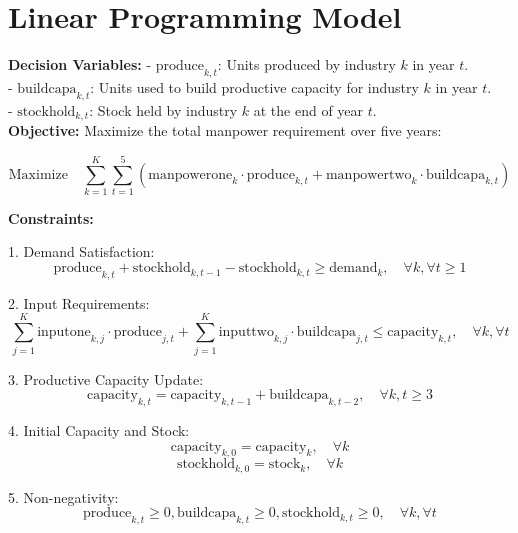 \documentclass{article}
\begin{document}
\section*{Linear Programming Model}

\textbf{Decision Variables:}  
- \( \text{produce}_{k,t} \): Units produced by industry \( k \) in year \( t \). \\
- \( \text{buildcapa}_{k,t} \): Units used to build productive capacity for industry \( k \) in year \( t \). \\
- \( \text{stockhold}_{k,t} \): Stock held by industry \( k \) at the end of year \( t \). \\

\textbf{Objective:}  
Maximize the total manpower requirement over five years:

\[
\text{Maximize} \quad \sum_{k=1}^{K} \sum_{t=1}^{5} (\text{manpowerone}_k \cdot \text{produce}_{k,t} + \text{manpowertwo}_k \cdot \text{buildcapa}_{k,t})
\]

\textbf{Constraints:}

1. Demand Satisfaction:
   \[
   \text{produce}_{k,t} + \text{stockhold}_{k,t-1} - \text{stockhold}_{k,t} \geq \text{demand}_{k}, \quad \forall k, \forall t \geq 1
   \]

2. Input Requirements:
   \[
   \sum_{j=1}^{K} \text{inputone}_{k,j} \cdot \text{produce}_{j,t} + \sum_{j=1}^{K} \text{inputtwo}_{k,j} \cdot \text{buildcapa}_{j,t} \leq \text{capacity}_{k,t}, \quad \forall k, \forall t
   \]

3. Productive Capacity Update:
   \[
   \text{capacity}_{k,t} = \text{capacity}_{k,t-1} + \text{buildcapa}_{k,t-2}, \quad \forall k, t \geq 3
   \]

4. Initial Capacity and Stock:
   \[
   \text{capacity}_{k,0} = \text{capacity}_{k}, \quad \forall k
   \]
   \[
   \text{stockhold}_{k,0} = \text{stock}_{k}, \quad \forall k
   \]

5. Non-negativity:
   \[
   \text{produce}_{k,t} \geq 0, \text{buildcapa}_{k,t} \geq 0, \text{stockhold}_{k,t} \geq 0, \quad \forall k, \forall t
   \]
\end{document}
